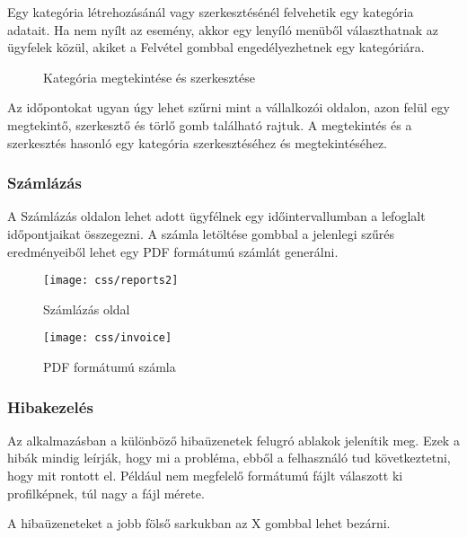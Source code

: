 Egy kategória létrehozásánál vagy szerkesztésénél felvehetik egy kategória adatait. Ha nem nyílt az esemény, akkor egy lenyíló menüből választhatnak az ügyfelek közül, akiket a Felvétel gombbal engedélyezhetnek egy kategóriára.

\begin{figure}[H]
    \centering
    \caption{Kategória megtekintése és szerkesztése}
\end{figure}

Az időpontokat ugyan úgy lehet szűrni mint a vállalkozói oldalon, azon felül egy megtekintő, szerkesztő és törlő gomb található rajtuk. A megtekintés és a szerkesztés hasonló egy kategória szerkesztéséhez és megtekintéséhez.

\clearpage

\subsubsection{Számlázás}

A Számlázás oldalon lehet adott ügyfélnek egy időintervallumban a lefoglalt időpontjaikat összegezni. A számla letöltése gombbal a jelenlegi szűrés eredményeiből lehet egy PDF formátumú számlát generálni.

\begin{figure}[H]
    \centering
    \texttt{[image: css/reports2]}
    \caption{Számlázás oldal}
\end{figure}

\begin{figure}[H]
    \centering
    \texttt{[image: css/invoice]}
    \caption{PDF formátumú számla}
\end{figure}

\subsubsection{Hibakezelés}

Az alkalmazásban a különböző hibaüzenetek felugró ablakok jelenítik meg. Ezek a hibák mindig leírják, hogy mi a probléma, ebből a felhasználó tud következtetni, hogy mit rontott el. Például nem megfelelő formátumú fájlt válaszott ki profilképnek, túl nagy a fájl mérete.

A hibaüzeneteket a jobb fölső sarkukban az X gombbal lehet bezárni.

